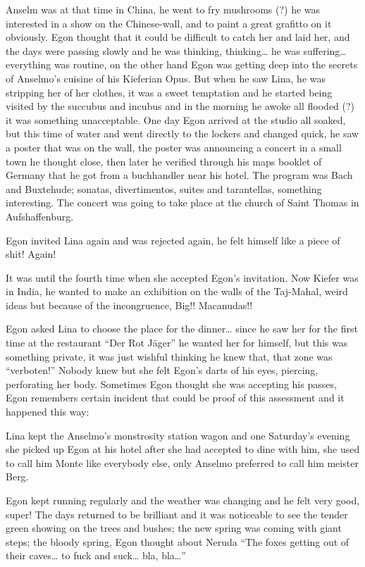 \documentclass[smalldemyvopaper,11pt,twoside,onecolumn,openright,extrafontsizes]{memoir}
\begin{document}
Anselm was at that time in China, he went to fry mushrooms (?) he was interested in a show on the Chinese-wall, and to paint a great grafitto on it obviously. Egon thought that it could be difficult to catch her and laid her, and the days were passing slowly and he was thinking, thinking… he was suffering… everything was routine, on the other hand Egon was getting deep into the secrets of Anselmo’s cuisine of his Kieferian Opus. But when he saw Lina, he was stripping her of her clothes, it was a sweet temptation and he started being visited by the succubus and incubus and in the morning he awoke all flooded (?) it was something unacceptable. One day Egon arrived at the studio all soaked, but this time of water and went directly to the lockers and changed quick, he saw a poster that was on the wall, the poster was announcing a concert in a small town he thought close, then later he verified through his maps booklet of Germany that he got from a buchhandler near his hotel. The program was Bach and Buxtehude; sonatas, divertimentos, suites and tarantellas, something interesting. The concert was going to take place at the church of Saint Thomas in Aufshaffenburg. 

Egon invited Lina again and was rejected again, he felt himself like a piece of shit! Again!

It was until the fourth time when she accepted Egon’s invitation. Now Kiefer was in India, he wanted to make an exhibition on the walls of the Taj-Mahal, weird ideas but because of the incongruence, Big!! Macanudas!!

Egon asked Lina to choose the place for the dinner… since he saw her for the first time at the restaurant “Der Rot Jäger” he wanted her for himself, but this was something private, it was just wishful thinking he knew that, that zone was “verboten!” Nobody knew but she felt Egon’s darts of his eyes, piercing, perforating her body. Sometimes Egon thought she was accepting his passes, Egon remembers certain incident that could be proof of this assessment and it happened this way:

Lina kept the Anselmo’s monstrosity station wagon and one Saturday’s evening she picked up Egon at his hotel after she had accepted to dine with him, she used to call him Monte like everybody else, only Anselmo preferred to call him meister Berg.

Egon kept running regularly and the weather was changing and he felt very good, super! The days returned to be brilliant and it was noticeable to see the tender green showing on the trees and bushes; the new spring was coming with giant steps; the bloody spring, Egon thought about Neruda “The foxes getting out of their caves… to fuck and suck… bla, bla…”
\end{document}
